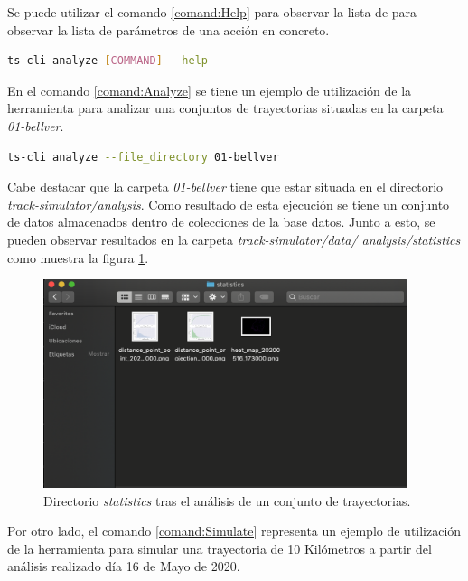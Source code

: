 Se puede utilizar el comando \ref{comand:Help} para observar la lista de para observar 
la lista de parámetros de una acción en concreto.

\begin{lstlisting}[caption={Ejecución ayuda de comando}, language=bash, 
label={comand:Help}] 
	ts-cli analyze [COMMAND] --help
\end{lstlisting}

En el comando \ref{comand:Analyze} se tiene un ejemplo de utilización de la 
herramienta para analizar una conjuntos de trayectorias situadas en la carpeta 
\textit{01-bellver}.

\begin{lstlisting}[caption={Ejecución análisis}, language=bash, 
label={comand:Analyze}] 
	ts-cli analyze --file_directory 01-bellver
\end{lstlisting}

Cabe destacar que la carpeta \textit{01-bellver} tiene que estar situada en el directorio 
\textit{track-simulator/analysis}. Como resultado de esta ejecución se tiene un 
conjunto de datos almacenados dentro de colecciones de la base datos. Junto a esto, 
se pueden observar resultados en la carpeta \textit{track-simulator/data/
analysis/statistics} como muestra la figura \ref{figure:StatisticsFolder}.

\begin{figure}[!htb]
\begin{center}
\includegraphics[width=0.95\textwidth]{./Imagenes/statisticsFolderResults.png}
\caption{Directorio \textit{statistics} tras el análisis de un conjunto de trayectorias.}
\label{figure:StatisticsFolder}
\end{center}
\end{figure}
\newpage

Por otro lado,  el comando \ref{comand:Simulate} representa un ejemplo de utilización 
de la herramienta para simular una trayectoria de 10 Kilómetros a partir del análisis 
realizado día 16 de Mayo de 2020.

